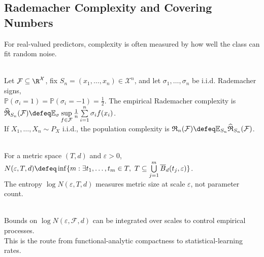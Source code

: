 \subsection{Rademacher Complexity and Covering Numbers}

For real-valued predictors, complexity is often measured by how well the class can fit random noise.

\begin{definition} \label{def:sl-rademacher-complexity} \\
Let $\mathcal{F}\subseteq\R^{\mathcal{X}}$, fix $S_n=(x_1,\ldots,x_n)\in\mathcal{X}^n$, and let $\sigma_1,\ldots,\sigma_n$ be i.i.d. Rademacher signs,\\
$\mathbb{P}(\sigma_i=1)=\mathbb{P}(\sigma_i=-1)=\frac{1}{2}$. The empirical Rademacher complexity is $\widehat{\mathfrak{R}}_{S_n}(\mathcal{F})\defeq\mathbb{E}_{\sigma}\sup\limits_{f\in\mathcal{F}}\frac{1}{n}\sum\limits_{i=1}^n\sigma_if(x_i)$.\\
If $X_1,\ldots,X_n\sim P_X$ i.i.d., the population complexity is $\mathfrak{R}_n(\mathcal{F})\defeq\mathbb{E}_{S_n}\widehat{\mathfrak{R}}_{S_n}(\mathcal{F})$.
\end{definition}

\begin{definition} \label{def:sl-covering-number} \\
For a metric space $(T,d)$ and $\varepsilon>0$, $N(\varepsilon,T,d)\defeq\inf\{m:\exists t_1,\ldots,t_m\in T,\ T\subseteq\bigcup\limits_{j=1}^m\overline{B}_d(t_j,\varepsilon)\}$.\\
The entropy $\log N(\varepsilon,T,d)$ measures metric size at scale $\varepsilon$, not parameter count.
\end{definition}

\begin{remark} \label{rem:sl-entropy-integrals} \\
Bounds on $\log N(\varepsilon,\mathcal{F},d)$ can be integrated over scales to control empirical processes.\\
This is the route from functional-analytic compactness to statistical-learning rates.
\end{remark}
